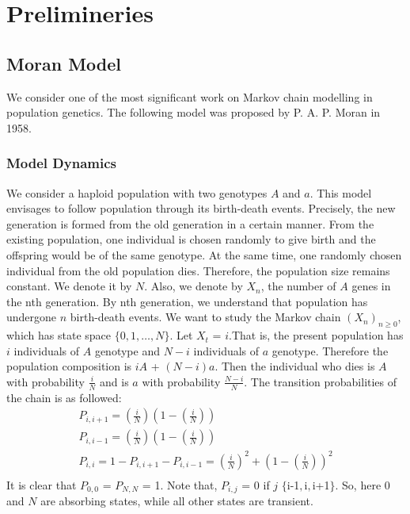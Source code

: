 \chapter{Prelimineries}
\section{Moran Model}
We consider one of the most significant work on Markov chain modelling in population genetics. The following model was proposed by P. A. P. Moran in 1958.
\subsection{Model Dynamics}
We consider a haploid population with two genotypes $A$ and $a$. This model envisages to follow population through its birth-death events. Precisely, the new generation is formed from the old generation in a certain manner.
\newline
From the existing population, one individual is chosen randomly to give birth and the offspring would be of the same genotype. At the same time, one randomly chosen individual from the old population dies. Therefore, the population size remains constant. We denote it by $N$. Also, we denote by $X_{n}$, the number of $A$ genes in the nth generation. By nth generation, we understand that population has undergone $n$ birth-death events. We want to study the Markov chain $(X_{n})_{n\geq0}$, which has state space $\{0, 1, \ldots, N\}$.
\newline
Let $X_{t}$ = $i$.That is, the present population has $i$ individuals of $A$ genotype and $N-i$ individuals of $a$ genotype. Therefore the population composition is $iA$ + $(N-i)a$. Then the individual who dies is $A$ with probability $\frac{i}{N}$ and is $a$ with probability $\frac{N-i}{N}$. The transition probabilities of the chain is as followed:
\newline
\begin{equation*}
\begin{split}
P_{i,i+1}  = \left(\frac{i}{N}\right)\left(1-\left(\frac{i}{N}\right)\right) \\
P_{i,i-1}  = \left(\frac{i}{N}\right)\left(1-\left(\frac{i}{N}\right)\right) \\
P_{i,i}  = 1 - P_{i,i+1} - P_{i,i-1} = \left(\frac{i}{N}\right)^{2} + \left(1-\left(\frac{i}{N}\right)\right)^{2} \\
\end{split}
\end{equation*}
It is clear that $P_{0,0}$ = $P_{N,N}$ = 1. Note that, $P_{i,j}$ = 0 if $j$ \notin $\{$i-1$, $i$ , $i+1$\}$.
\newline
So, here $0$ and $N$ are absorbing states, while all other states are transient. 
